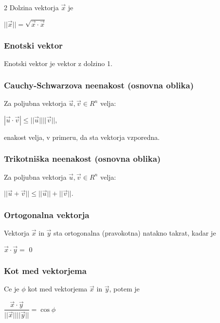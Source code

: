 \documentclass{article}
\begin{document}
\begin{multicols}{2}
	Dolzina vektorja $\vec{x}$ je
	\begin{center}
		$||\vec{x}|| = \sqrt{\vec{x} \cdot \vec{x}}$
	\end{center}

	\subsubsection{Enotski vektor}

	Enotski vektor je vektor z dolzino 1.

	\subsubsection{Cauchy-Schwarzova neenakost (osnovna oblika)}

	Za poljubna vektorja $\vec{u}, \vec{v} \in R^{n}$ velja:
	\begin{center}
		$|\vec{u} \cdot \vec{v}| \leq ||\vec{u}||||\vec{v}||$,
	\end{center}
	enakost velja, v primeru, da sta vektorja vzporedna.


	\subsubsection{Trikotniška neenakost (osnovna oblika)}

	Za poljubna vektorja $\vec{u}, \vec{v} \in R^{n}$ velja:
	\begin{center}
		$||\vec{u} + \vec{v}|| \leq ||\vec{u}||+||\vec{v}||$.
	\end{center}

	\subsubsection{Ortogonalna vektorja}

	Vektorja $\vec{x}$ in $\vec{y}$ sta ortogonalna
	(pravokotna) natakno takrat, kadar je
	\begin{center}
		$\vec{x} \cdot \vec{y} = $ 0
	\end{center}

	\subsubsection{Kot med vektorjema}

	Ce je $\phi$ kot med vektorjema $\vec{x}$ in $\vec{y}$, potem je
	\begin{center}
		$\dfrac{\vec{x} \cdot \vec{y}}{||\vec{x}|| ||\vec{y}||} =
			\cos \phi$
	\end{center}


\end{multicols}
\end{document}
